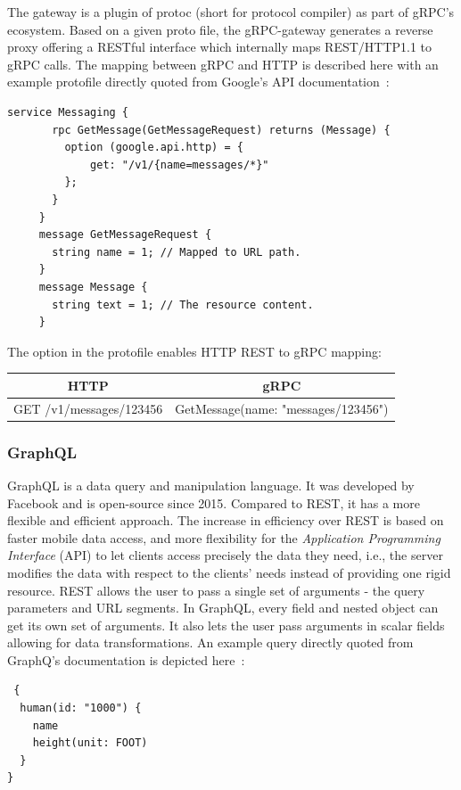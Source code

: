 The gateway is a plugin of protoc (short for protocol compiler) as part of gRPC's ecosystem. Based on a given proto file, the gRPC-gateway generates a reverse proxy offering a RESTful interface which internally maps REST/HTTP1.1 to gRPC calls. The mapping between gRPC and HTTP is described here with an example protofile directly quoted from Google's API documentation~\cite{Google-API-Documentation2019Http.proto.2019}:\\

\begin{lstlisting}[language=protobuf3,style=protobuf]
     service Messaging {
       rpc GetMessage(GetMessageRequest) returns (Message) {
         option (google.api.http) = {
             get: "/v1/{name=messages/*}"
         };
       }
     }
     message GetMessageRequest {
       string name = 1; // Mapped to URL path.
     }
     message Message {
       string text = 1; // The resource content.
     }
\end{lstlisting}

The option in the protofile enables HTTP REST to gRPC mapping:

    \begin{tabular}{c|c}
        \textbf{HTTP} & \textbf{gRPC} \\ \hline
        GET /v1/messages/123456 & GetMessage(name: "messages/123456")
    \end{tabular}

\subsubsection{GraphQL}
GraphQL is a data query and manipulation language. It was developed by Facebook and is open-source since 2015. Compared to REST, it has a more flexible and efficient approach. The increase in efficiency over REST is based on faster mobile data access, and more flexibility for the \textit{Application Programming Interface} (API) to let clients access precisely the data they need, i.e., the server modifies the data with respect to the clients' needs instead of providing one rigid resource. REST allows the user to pass a single set of arguments - the query parameters and URL segments. In GraphQL, every field and nested object can get its own set of arguments. It also lets the user pass arguments in scalar fields allowing for data transformations. An example query directly quoted from GraphQ's documentation is depicted here~\cite{GraphQL-Documentation2018Basics2018}:

\begin{lstlisting}
 {
  human(id: "1000") {
    name
    height(unit: FOOT)
  }
}
\end{lstlisting}


